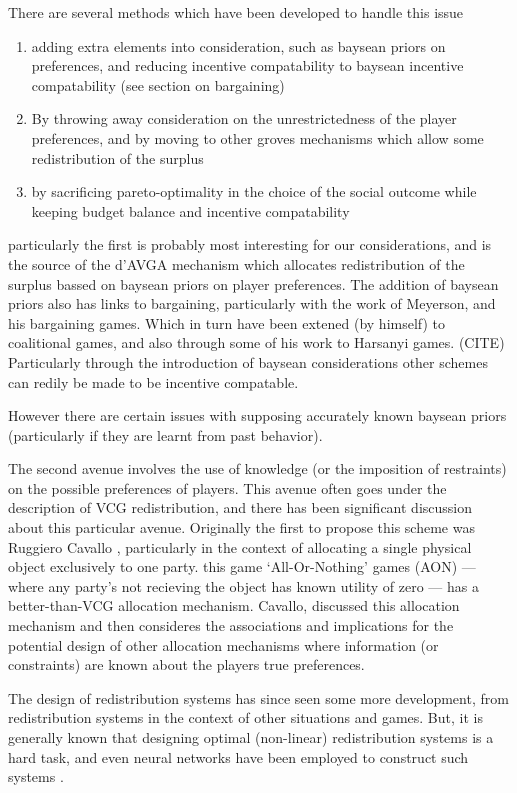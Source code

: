 \documentclass{article}
\begin{document}
There are several methods which have been developed to handle this issue
\begin{enumerate}
    \item adding extra elements into consideration, such as baysean priors on preferences, and reducing incentive compatability to baysean incentive compatability (see section on bargaining)
    \item By throwing away consideration on the unrestrictedness of the player preferences, and by moving to other groves mechanisms which allow some redistribution of the surplus
    \item by sacrificing pareto-optimality in the choice of the social outcome while keeping budget balance and incentive compatability
\end{enumerate}

particularly the first is probably most interesting for our considerations, and is the source of the d'AVGA mechanism which allocates redistribution of the surplus bassed on baysean priors on player preferences.
The addition of baysean priors also has links to bargaining, particularly with the work of Meyerson, and his bargaining games.
Which in turn have been extened (by himself) to coalitional games, and also through some of his work to Harsanyi games. (CITE)
Particularly through the introduction of baysean considerations other schemes can redily be made to be incentive compatable.

However there are certain issues with supposing accurately known baysean priors (particularly if they are learnt from past behavior).

The second avenue involves the use of knowledge (or the imposition of restraints) on the possible preferences of players.
This avenue often goes under the description of VCG redistribution, and there has been significant discussion about this particular avenue.
Originally the first to propose this scheme was Ruggiero Cavallo \cite{Cavallo:2006:ODM:1160633.1160790}, particularly in the context of allocating a single physical object exclusively to one party.
this game `All-Or-Nothing' games (AON) --- where any party's not recieving the object has known utility of zero --- has a better-than-VCG allocation mechanism.
Cavallo, discussed this allocation mechanism and then consideres the associations and implications for the potential design of other allocation mechanisms where information (or constraints) are known about the players true preferences.

The design of redistribution systems has since seen some more development, from redistribution systems in the context of other situations and games.
But, it is generally known that designing optimal (non-linear) redistribution systems is a hard task, and even neural networks have been employed to construct such systems \cite{DBLP:conf/atal/ManishaJG18}.
\end{document}
